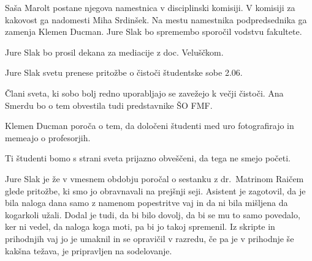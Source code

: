 \documentclass{seja}
\begin{document}
\begin{ad}
\begin{sklep*}
Saša Marolt postane njegova namestnica v disciplinski komisiji.
V komisiji za kakovost ga nadomesti Miha Srdinšek.
Na mestu namestnika podpredsednika ga zamenja Klemen Ducman.
Jure Slak bo spremembo sporočil vodstvu fakultete.
\end{sklep*}

\begin{sklep*}
Jure Slak bo prosil dekana za mediacije z doc. Veluščkom.
\end{sklep*}

Jure Slak svetu prenese pritožbe o čistoči študentske sobe 2.06.
\begin{sklep*}
Člani sveta, ki sobo bolj redno uporabljajo se zavežejo k večji čistoči.
Ana Smerdu bo o tem obvestila tudi predstavnike ŠO FMF.
\end{sklep*}

Klemen Ducman poroča o tem, da določeni študenti med uro fotografirajo in
memeajo o profesorjih.
\begin{sklep*}
Ti študenti bomo s strani sveta prijazno obveščeni, da tega ne smejo početi.
\end{sklep*}

Jure Slak je že v vmesnem obdobju poročal o sestanku z dr.~Matrinom Raičem
glede pritožbe, ki smo jo obravnavali na prejšnji seji.
Asistent je zagotovil, da je bila naloga dana samo z namenom popestritve vaj
in da ni bila mišljena da kogarkoli užali.
Dodal je tudi, da bi bilo dovolj, da bi se mu to samo povedalo, ker ni vedel,
da naloga koga moti, pa bi jo takoj spremenil. Iz skripte in prihodnjih vaj jo je umaknil
in se opravičil v razredu, če pa je v prihodnje še kakšna težava, je pripravljen na sodelovanje.

\end{ad}

\makeatletter \global\let\@enddocumenthook\@empty \makeatother
{}
\end{document}
